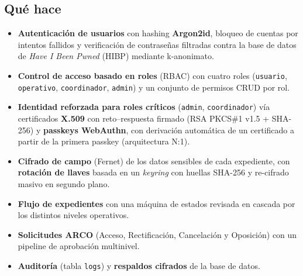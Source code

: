 \documentclass[10pt,letterpaper]{report}
\begin{document}
\subsection*{Qu\'e hace}
\begin{itemize}
  \item \textbf{Autenticaci\'on de usuarios} con hashing \textbf{Argon2id}, bloqueo de cuentas por
  intentos fallidos y verificaci\'on de contrase\~nas filtradas contra la base de datos de
  \emph{Have I Been Pwned} (HIBP) mediante k-anonimato.
  \item \textbf{Control de acceso basado en roles} (RBAC) con cuatro roles
  (\texttt{usuario}, \texttt{operativo}, \texttt{coordinador}, \texttt{admin}) y un conjunto de
  permisos CRUD por rol.
  \item \textbf{Identidad reforzada para roles cr\'iticos} (\texttt{admin}, \texttt{coordinador})
  v\'ia certificados \textbf{X.509} con reto--respuesta firmado (RSA PKCS\#1 v1.5 + SHA-256) y
  \textbf{passkeys WebAuthn}, con derivaci\'on autom\'atica de un certificado a partir de la primera
  passkey (arquitectura N:1).
  \item \textbf{Cifrado de campo} (Fernet) de los datos sensibles de cada expediente, con
  \textbf{rotaci\'on de llaves} basada en un \emph{keyring} con huellas SHA-256 y re-cifrado masivo
  en segundo plano.
  \item \textbf{Flujo de expedientes} con una m\'aquina de estados revisada en cascada por los
  distintos niveles operativos.
  \item \textbf{Solicitudes ARCO} (Acceso, Rectificaci\'on, Cancelaci\'on y Oposici\'on) con un
  pipeline de aprobaci\'on multinivel.
  \item \textbf{Auditor\'ia} (tabla \texttt{logs}) y \textbf{respaldos cifrados} de la base de datos.
\end{itemize}
\end{document}
